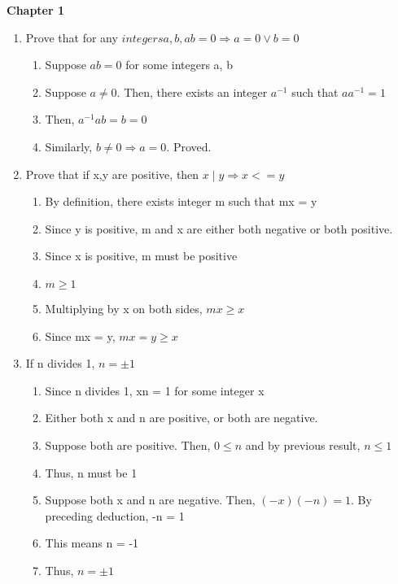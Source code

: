 \documentclass{article}
\begin{document}
\textbf{Chapter 1}
\begin{enumerate}
\item Prove that for any  $ integers a, b, ab = 0 \Rightarrow a = 0 \lor b = 0 $

\begin{enumerate}
\item Suppose $ ab = 0 $ for some integers a, b
\item Suppose $ a \neq 0. $ Then, there exists an integer $ a^{-1} $ such that $aa^{-1} = 1 $
\item Then, $a^{-1} a b = b = 0 $
\item Similarly, $ b \neq 0 \Rightarrow a = 0 $. Proved.
\end{enumerate}

\item Prove that if x,y are positive, then $ x \mid y \Rightarrow x <= y $
\begin{enumerate}
\item By definition, there exists integer m such that mx = y
\item Since y is positive, m and x are either both negative or both positive.
\item Since x is positive, m must be positive
\item $ m \geq 1 $
\item Multiplying by x on both sides, $ mx \geq x $
\item Since mx = y, $ mx = y \geq x $
\end{enumerate}

\item If n divides 1, $ n = \pm 1 $
\begin{enumerate}
\item Since n divides 1, xn = 1 for some integer x
\item Either both x and n are positive, or both are negative.
\item Suppose both are positive. Then, $ 0 \leq n $ and by previous result, $ n \leq 1 $
\item Thus, n must be 1
\item Suppose both x and n are negative. Then, $ (-x)(-n) = 1 $. By preceding
deduction, -n = 1
\item This means n = -1
\item Thus, $ n = \pm 1 $
\end{enumerate}
\end{enumerate}
\end{document}
